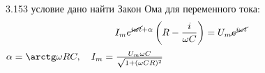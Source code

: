 \testCom
{%
	3.153
}
{%
	условие
}
{%
	дано
}
{%
	найти
}
{%
	Закон Ома для переменного тока:\\
	\[I_m e^{\cancel{i \omega t} + \alpha} \left(R - \frac{i}{\omega C}\right) = U_m \cancel{e^{i \omega t}}\]
	$\alpha = \arctg \omega R C, \quad I_m = \frac{U_m \omega C}{\sqrt{1 + (\omega C R)^2}}$\\
	
}

